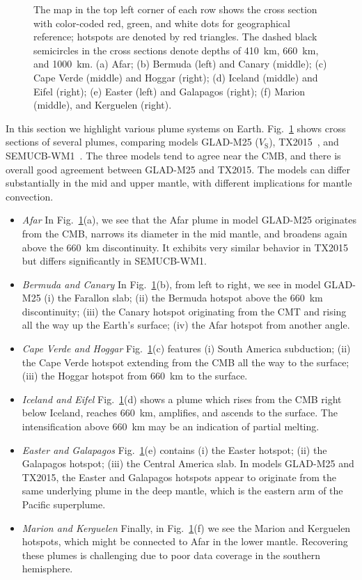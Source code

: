 \documentclass[extra,mreferee]{gji}
\begin{document}
\begin{figure}
{{    The map in the top left corner of each row shows the cross section with color-coded red, green, and white dots for geographical reference;
    hotspots are denoted by red triangles.
    The dashed black semicircles in the cross sections denote depths of 410~km, 660~km, and 1000~km.
    (a) Afar; (b) Bermuda (left) and Canary (middle); (c) Cape Verde (middle) and Hoggar (right); (d) Iceland (middle) and Eifel (right); (e) Easter (left) and Galapagos (right); (f) Marion (middle), and Kerguelen (right). }}
    \label{fig:plumes}
\end{figure}

In this section we highlight various plume systems on Earth. Fig.~\ref{fig:plumes}
shows cross sections of several plumes, comparing models GLAD-M25 ($V_\textrm{S}$),
TX2015~\citep[$V_\textrm{S}$;][]{TX2015}, and SEMUCB-WM1~\citep[$V_\textrm{S}$;][]{french2015broad}.
The three models tend to agree near the CMB,
and there is overall good agreement between GLAD-M25 and TX2015.
The models can differ substantially in the mid and upper mantle,
with different implications for mantle
convection.

\begin{itemize}
\item[]{\it Afar} In Fig.~\ref{fig:plumes}(a),
we see that the Afar plume in model GLAD-M25 originates from the CMB, narrows its diameter
in the mid mantle, and broadens again above the 660~km discontinuity.
It exhibits
very similar behavior in TX2015 but differs significantly in SEMUCB-WM1.  
\item[]{\it Bermuda and Canary} In Fig.~\ref{fig:plumes}(b), from left to right, we see in model GLAD-M25 (i) the Farallon
slab; (ii) the Bermuda hotspot above the 660~km discontinuity; (iii) the Canary hotspot originating from the CMT and
rising all the way up the Earth's surface; (iv) the Afar hotspot from another angle.
\item[]{\it Cape Verde and Hoggar} Fig.~\ref{fig:plumes}(c) features (i) South America subduction; (ii) the Cape Verde hotspot extending from the CMB all the way to the surface; (iii) the Hoggar hotspot from 660~km to the surface. 
\item[]{\it Iceland and Eifel} Fig.~\ref{fig:plumes}(d) shows a plume which rises from the CMB right below Iceland, reaches 660~km, amplifies,
and ascends to the surface.
The intensification above 660~km may be an indication of partial melting.
\item[]{\it Easter and Galapagos} Fig.~\ref{fig:plumes}(e) contains (i) the Easter hotspot; (ii) the Galapagos
hotspot; (iii) the Central America slab.
In models GLAD-M25 and TX2015,
the Easter and Galapagos hotspots appear to originate from the same underlying plume in the deep mantle,
which is the eastern arm of the Pacific superplume.
\item[]{\it Marion and Kerguelen}
Finally,
in Fig.~\ref{fig:plumes}(f) we see the Marion and Kerguelen hotspots, which might be connected to Afar in the lower mantle.
Recovering these plumes is challenging due to poor data coverage in the southern hemisphere.
\end{itemize}
\end{document}
